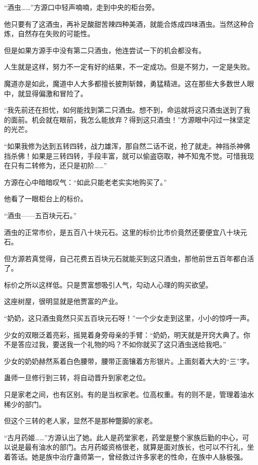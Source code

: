
\begin{this_body}

“酒虫……”方源口中轻声喃喃，走到中央的柜台旁。

他只要有了这酒虫，再补足酸甜苦辣四种美酒，就能合炼成四味酒虫。当然这种合炼，自然存在失败的可能性。

但是如果方源手中没有第二只酒虫，他连尝试一下的机会都没有。

人生就是这样，努力不一定有好的结果，不一定成功。但是不努力，一定是失败。

魔道亦是如此，魔道中人大多都擅长披荆斩棘，勇猛精进。这在那些大多数世人眼中，就显得偏激和冒险了。

“我先前还在担忧，如何能找到第二只酒虫。想不到，命运就将这只酒虫送到了我的面前。机会就在眼前，我怎么能放弃？得到这只酒虫！”方源眼中闪过一抹坚定的光芒。

“如果我修为达到五转四转，战力雄浑，那自然二话不说，抢了就走。神挡杀神佛挡杀佛！如果是三转四转，手段丰富，就可以偷盗窃取，神不知鬼不觉。可惜我现在只有二转修为，还只是初阶……”

方源在心中暗暗叹气：“如此只能老老实实地购买了。”

他看了一眼柜台上的标价。

“酒虫——五百块元石。”

酒虫的正常市价，是五百八十块元石。这里的标价比市价竟然还要便宜八十块元石。

但方源若真觉得，自己花费五百块元石就能买到这只酒虫，那他前世五百年都白活了。

标价之所以这样低。只是贾富想吸引人气，勾动人心理的购买欲望。

这座树屋，很明显就是他贾富的产业。

“奶奶，这只酒虫竟然只买五百块元石呀！”一个少女走到这里，小小的惊呼一声。

少女的双眼泛着亮彩，摇晃着身旁母亲的手臂：“奶奶，明天就是开窍大典了。你不是答应过我，要送我一个礼物的吗？不如你就买了这只酒虫送给我吧。”

少女的奶奶赫然系着白色腰带，腰带正面镶着方形银片。上面刻着大大的“三”字。

蛊师一旦修行到三转，将自动晋升到家老之位。

只是家老之间，也有区别。有的是当权家老。位高权重。有的则不是，管理着油水稀少的部门。

但这个三转的老人家，显然不是那种蹩脚的家老。

“古月药姬……”方源认出了她。此人是药堂家老，药堂是整个家族后勤的中心，可以说是最有油水的部门。古月药姬资格很老，就算是面对族长，也可以不行礼，坐着答话。她是族中治疗蛊师第一，曾经救过许多家老的性命，在族中人脉极强。


\end{this_body}
